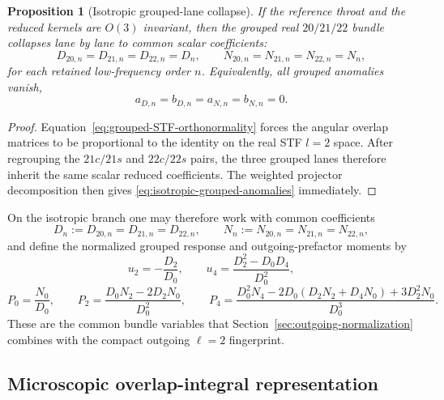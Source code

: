 \documentclass[11pt]{article}
\newtheorem{proposition}[theorem]{Proposition}
\theoremstyle{definition}
\begin{document}
\begin{proposition}[Isotropic grouped-lane collapse]
If the reference throat and the reduced kernels are $O(3)$ invariant, then the grouped real $20/21/22$ bundle collapses lane by lane to common scalar coefficients:
\begin{equation}
D_{20,n}=D_{21,n}=D_{22,n}=D_n,
\qquad
N_{20,n}=N_{21,n}=N_{22,n}=N_n,
\label{eq:isotropic-collapse}
\end{equation}
for each retained low-frequency order $n$. Equivalently, all grouped anomalies vanish,
\begin{equation}
a_{D,n}=b_{D,n}=a_{N,n}=b_{N,n}=0.
\label{eq:isotropic-grouped-anomalies}
\end{equation}
\end{proposition}

\begin{proof}
Equation~\eqref{eq:grouped-STF-orthonormality} forces the angular overlap matrices to be proportional to the identity on the real STF $l=2$ space. After regrouping the $21c/21s$ and $22c/22s$ pairs, the three grouped lanes therefore inherit the same scalar reduced coefficients. The weighted projector decomposition then gives \eqref{eq:isotropic-grouped-anomalies} immediately.
\end{proof}

On the isotropic branch one may therefore work with common coefficients
\begin{equation}
D_n:=D_{20,n}=D_{21,n}=D_{22,n},
\qquad
N_n:=N_{20,n}=N_{21,n}=N_{22,n},
\label{eq:grouped-common-coefficients}
\end{equation}
and define the normalized grouped response and outgoing-prefactor moments by
\begin{equation}
u_2=-\frac{D_2}{D_0},
\qquad
u_4=\frac{D_2^2-D_0D_4}{D_0^2},
\label{eq:grouped-common-u24}
\end{equation}
\begin{equation}
P_0=\frac{N_0}{D_0},
\qquad
P_2=\frac{D_0N_2-2D_2N_0}{D_0^2},
\qquad
P_4=\frac{D_0^2N_4-2D_0(D_2N_2+D_4N_0)+3D_2^2N_0}{D_0^3}.
\label{eq:grouped-common-prefactors}
\end{equation}
These are the common bundle variables that Section~\ref{sec:outgoing-normalization} combines with the compact outgoing $\ell=2$ fingerprint.

\subsection{Microscopic overlap-integral representation}
\end{document}
